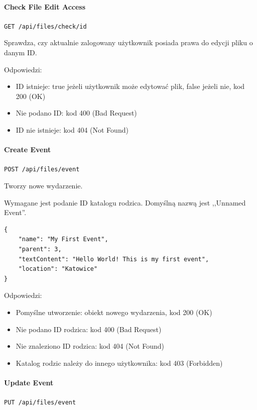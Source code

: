 \documentclass[a4paper,twoside,12pt]{book}
\begin{document}
\paragraph{Check File Edit Access}\label{check-file-edit-access}

\texttt{GET /api/files/check/{id}}

Sprawdza, czy aktualnie zalogowany użytkownik posiada prawa do edycji pliku o danym ID.

Odpowiedzi: 
\begin{itemize}
	\item ID istnieje: true jeżeli użytkownik może edytować plik, false jeżeli nie, kod 200 (OK) 
	\item  Nie podano ID: kod 400 (Bad Request) 
	\item ID nie istnieje: kod 404 (Not Found)
\end{itemize}

\paragraph{Create Event}\label{create-event}

\texttt{POST /api/files/event}

Tworzy nowe wydarzenie.

Wymagane jest podanie ID katalogu rodzica. Domyślną nazwą jest ,,Unnamed Event''.

\begin{verbatim}
{
    "name": "My First Event",
    "parent": 3,
    "textContent": "Hello World! This is my first event",
    "location": "Katowice"
}
\end{verbatim}

Odpowiedzi: 
\begin{itemize}
	\item Pomyślne utworzenie: obiekt nowego wydarzenia, kod 200 (OK) 
	\item Nie podano ID rodzica: kod 400 (Bad Request)
	\item Nie znaleziono ID rodzica: kod 404 (Not Found) 
	\item Katalog rodzic należy do innego użytkownika: kod 403 (Forbidden)
\end{itemize}

\paragraph{Update Event}\label{update-event}

\texttt{PUT /api/files/event}
\end{document}
